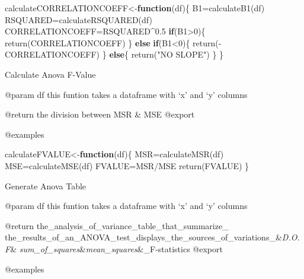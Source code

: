 \documentclass[
]{article}
\newenvironment{Shaded}{\begin{snugshade}}{\end{snugshade}}
\newcommand{\ControlFlowTok}[1]{\textcolor[rgb]{0.13,0.29,0.53}{\textbf{#1}}}
\newcommand{\DecValTok}[1]{\textcolor[rgb]{0.00,0.00,0.81}{#1}}
\newcommand{\FloatTok}[1]{\textcolor[rgb]{0.00,0.00,0.81}{#1}}
\newcommand{\FunctionTok}[1]{\textcolor[rgb]{0.00,0.00,0.00}{#1}}
\newcommand{\NormalTok}[1]{#1}
\newcommand{\OtherTok}[1]{\textcolor[rgb]{0.56,0.35,0.01}{#1}}
\newcommand{\SpecialCharTok}[1]{\textcolor[rgb]{0.00,0.00,0.00}{#1}}
\newcommand{\StringTok}[1]{\textcolor[rgb]{0.31,0.60,0.02}{#1}}
\begin{document}
\begin{Shaded}
\begin{Highlighting}[]
\NormalTok{calculateCORRELATIONCOEFF}\OtherTok{\textless{}{-}}\ControlFlowTok{function}\NormalTok{(df)\{}
\NormalTok{  B1}\OtherTok{=}\FunctionTok{calculateB1}\NormalTok{(df)}
\NormalTok{  RSQUARED}\OtherTok{=}\FunctionTok{calculateRSQUARED}\NormalTok{(df)}
\NormalTok{  CORRELATIONCOEFF}\OtherTok{=}\NormalTok{RSQUARED}\SpecialCharTok{\^{}}\FloatTok{0.5}
  \ControlFlowTok{if}\NormalTok{(B1}\SpecialCharTok{\textgreater{}}\DecValTok{0}\NormalTok{)\{}
    \FunctionTok{return}\NormalTok{(CORRELATIONCOEFF)}
\NormalTok{  \} }\ControlFlowTok{else} \ControlFlowTok{if}\NormalTok{(B1}\SpecialCharTok{\textless{}}\DecValTok{0}\NormalTok{)\{}
    \FunctionTok{return}\NormalTok{(}\SpecialCharTok{{-}}\NormalTok{CORRELATIONCOEFF)}
\NormalTok{  \} }\ControlFlowTok{else}\NormalTok{\{}
    \FunctionTok{return}\NormalTok{(}\StringTok{"NO SLOPE"}\NormalTok{)}
\NormalTok{  \}}
\NormalTok{\}}
\end{Highlighting}
\end{Shaded}

Calculate Anova F-Value

@param df this funtion takes a dataframe with `x' and `y' columns

@return the division between MSR \& MSE @export

@examples

\begin{Shaded}
\begin{Highlighting}[]
\NormalTok{calculateFVALUE}\OtherTok{\textless{}{-}}\ControlFlowTok{function}\NormalTok{(df)\{}
\NormalTok{  MSR}\OtherTok{=}\FunctionTok{calculateMSR}\NormalTok{(df)}
\NormalTok{  MSE}\OtherTok{=}\FunctionTok{calculateMSE}\NormalTok{(df)}
\NormalTok{  FVALUE}\OtherTok{=}\NormalTok{MSR}\SpecialCharTok{/}\NormalTok{MSE}
  \FunctionTok{return}\NormalTok{(FVALUE)}
\NormalTok{\}}
\end{Highlighting}
\end{Shaded}

Generate Anova Table

@param df this funtion takes a dataframe with `x' and `y' columns

@return the\_analysis\_of\_variance\_table\_that\_summarize\_
the\_results\_of\_an\_ANOVA\_test\_displays\_the\_sources\_of\_variations\_\&\emph{D.O.F}\&\emph{
sum\_of\_squares}\&\emph{mean\_squares}\&\_F-statistics @export

@examples
\end{document}
